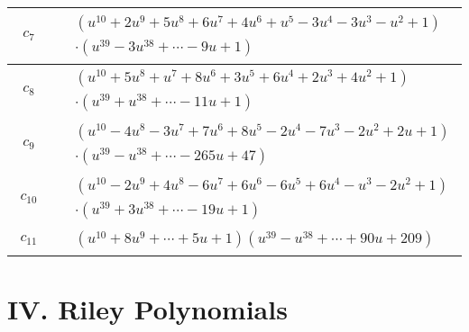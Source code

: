 \documentclass[1p]{elsarticle_modified}
\theoremstyle{definition}
\begin{document}
\begin{tabular}{m{50pt}|m{274pt}}
\hline $$\begin{aligned}c_{7}\end{aligned}$$&$\begin{aligned}
&(u^{10}+2 u^9+5 u^8+6 u^7+4 u^6+u^5-3 u^4-3 u^3- u^2+1)\\
&\cdot(u^{39}-3 u^{38}+\cdots-9 u+1)
\end{aligned}$\\
\hline $$\begin{aligned}c_{8}\end{aligned}$$&$\begin{aligned}
&(u^{10}+5 u^8+u^7+8 u^6+3 u^5+6 u^4+2 u^3+4 u^2+1)\\
&\cdot(u^{39}+u^{38}+\cdots-11 u+1)
\end{aligned}$\\
\hline $$\begin{aligned}c_{9}\end{aligned}$$&$\begin{aligned}
&(u^{10}-4 u^8-3 u^7+7 u^6+8 u^5-2 u^4-7 u^3-2 u^2+2 u+1)\\
&\cdot(u^{39}- u^{38}+\cdots-265 u+47)
\end{aligned}$\\
\hline $$\begin{aligned}c_{10}\end{aligned}$$&$\begin{aligned}
&(u^{10}-2 u^9+4 u^8-6 u^7+6 u^6-6 u^5+6 u^4- u^3-2 u^2+1)\\
&\cdot(u^{39}+3 u^{38}+\cdots-19 u+1)
\end{aligned}$\\
\hline $$\begin{aligned}c_{11}\end{aligned}$$&$\begin{aligned}
&(u^{10}+8 u^9+\cdots+5 u+1)(u^{39}- u^{38}+\cdots+90 u+209)
\end{aligned}$\\
\hline
\end{tabular}\newpage\renewcommand{\arraystretch}{1}
\centering \section*{ IV. Riley Polynomials}
\end{document}
